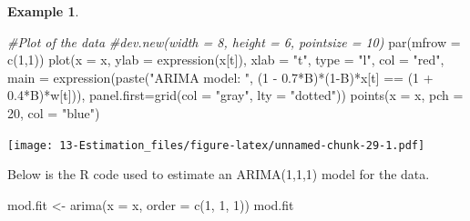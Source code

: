 \documentclass[
]{book}
\newenvironment{Shaded}{\begin{snugshade}}{\end{snugshade}}
\newcommand{\AttributeTok}[1]{\textcolor[rgb]{0.77,0.63,0.00}{#1}}
\newcommand{\CommentTok}[1]{\textcolor[rgb]{0.56,0.35,0.01}{\textit{#1}}}
\newcommand{\DecValTok}[1]{\textcolor[rgb]{0.00,0.00,0.81}{#1}}
\newcommand{\FloatTok}[1]{\textcolor[rgb]{0.00,0.00,0.81}{#1}}
\newcommand{\FunctionTok}[1]{\textcolor[rgb]{0.00,0.00,0.00}{#1}}
\newcommand{\NormalTok}[1]{#1}
\newcommand{\OtherTok}[1]{\textcolor[rgb]{0.56,0.35,0.01}{#1}}
\newcommand{\SpecialCharTok}[1]{\textcolor[rgb]{0.00,0.00,0.00}{#1}}
\newcommand{\StringTok}[1]{\textcolor[rgb]{0.31,0.60,0.02}{#1}}
\theoremstyle{definition}
\theoremstyle{definition}
\newtheorem{example}{Example}[chapter]
\theoremstyle{definition}
\theoremstyle{definition}
\theoremstyle{remark}
\begin{document}
\begin{example}
\begin{Shaded}
\end{Shaded}

\begin{Shaded}
\begin{Highlighting}[]
\CommentTok{\#Plot of the data}
  \CommentTok{\#dev.new(width = 8, height = 6, pointsize = 10)}
  \FunctionTok{par}\NormalTok{(}\AttributeTok{mfrow =} \FunctionTok{c}\NormalTok{(}\DecValTok{1}\NormalTok{,}\DecValTok{1}\NormalTok{))}
  \FunctionTok{plot}\NormalTok{(}\AttributeTok{x =}\NormalTok{ x, }\AttributeTok{ylab =} \FunctionTok{expression}\NormalTok{(x[t]), }\AttributeTok{xlab =} \StringTok{"t"}\NormalTok{, }\AttributeTok{type =} \StringTok{"l"}\NormalTok{, }\AttributeTok{col =} \StringTok{"red"}\NormalTok{,  }
        \AttributeTok{main =}  \FunctionTok{expression}\NormalTok{(}\FunctionTok{paste}\NormalTok{(}\StringTok{"ARIMA model: "}\NormalTok{, (}\DecValTok{1} \SpecialCharTok{{-}} \FloatTok{0.7}\SpecialCharTok{*}\NormalTok{B)}\SpecialCharTok{*}\NormalTok{(}\DecValTok{1}\SpecialCharTok{{-}}\NormalTok{B)}\SpecialCharTok{*}\NormalTok{x[t] }\SpecialCharTok{==}\NormalTok{ (}\DecValTok{1} \SpecialCharTok{+} \FloatTok{0.4}\SpecialCharTok{*}\NormalTok{B)}\SpecialCharTok{*}\NormalTok{w[t])), }
        \AttributeTok{panel.first=}\FunctionTok{grid}\NormalTok{(}\AttributeTok{col =} \StringTok{"gray"}\NormalTok{, }\AttributeTok{lty =} \StringTok{"dotted"}\NormalTok{))}
  \FunctionTok{points}\NormalTok{(}\AttributeTok{x =}\NormalTok{ x, }\AttributeTok{pch =} \DecValTok{20}\NormalTok{, }\AttributeTok{col =} \StringTok{"blue"}\NormalTok{)}
\end{Highlighting}
\end{Shaded}

\texttt{[image: 13-Estimation\_files/figure-latex/unnamed-chunk-29-1.pdf]}

Below is the R code used to estimate an ARIMA(1,1,1) model for the data.

\begin{Shaded}
\begin{Highlighting}[]
\NormalTok{mod.fit }\OtherTok{\textless{}{-}} \FunctionTok{arima}\NormalTok{(}\AttributeTok{x =}\NormalTok{ x, }\AttributeTok{order =} \FunctionTok{c}\NormalTok{(}\DecValTok{1}\NormalTok{, }\DecValTok{1}\NormalTok{, }\DecValTok{1}\NormalTok{))}
\NormalTok{  mod.fit}
\end{Highlighting}
\end{Shaded}


\end{example}
\end{document}
